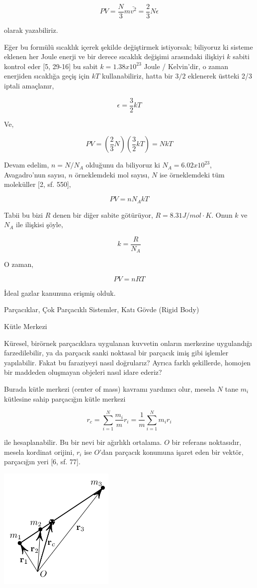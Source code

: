 \documentclass[12pt,fleqn]{article}\usepackage{../../common}
\begin{document}
$$
PV = \frac{N}{3} m \bar{v^2} = \frac{2}{3} N \epsilon
$$

olarak yazabiliriz.

Eğer bu formülü sıcaklık içerek şekilde değiştirmek istiyorsak; biliyoruz ki
sisteme eklenen her Joule enerji ve bir derece sıcaklık değişimi arasındaki
ilişkiyi $k$ sabiti kontrol eder [5, 29-16] bu sabit $k = 1.38 x 10^{23}$ Joule
/ Kelvin'dir, o zaman enerjiden sıcaklığa geçiş için $kT$ kullanabiliriz, hatta
bir $3/2$ eklenerek üstteki 2/3 iptali amaçlanır,

$$
\epsilon = \frac{3}{2} k T
$$

Ve,

$$
PV = \left( \frac{2}{3} N \right) \left( \frac{3}{2} k T \right) = N k T
$$

Devam edelim, $n = N / N_A$ olduğunu da biliyoruz ki $N_A = 6.02 x 10^{23}$,
Avagadro'nun sayısı, $n$ örneklemdeki mol sayısı, $N$ ise örneklemdeki tüm
moleküller [2, sf. 550],

$$
PV = n N_A k T
$$

Tabii bu bizi $R$ denen bir diğer sabite götürüyor, $R = 8.31 J/mol \cdot
K$. Onun $k$ ve $N_A$ ile ilişkisi şöyle,

$$
k = \frac{R}{N_A}
$$

O zaman,

$$
PV = n R T
$$

İdeal gazlar kanununa erişmiş olduk.


Parçacıklar, Çok Parçacıklı Sistemler, Katı Gövde (Rigid Body)

Kütle Merkezi

Küresel, birörnek parçacıklara uygulanan kuvvetin onların merkezine uygulandığı
farzedilebilir, ya da parçacık sanki noktasal bir parçacık imiş gibi işlemler
yapılabilir. Fakat bu faraziyeyi nasıl doğrularız? Ayrıca farklı şekillerde,
homojen bir maddeden oluşmayan objeleri nasıl idare ederiz?

Burada kütle merkezi (center of mass) kavramı yardımcı olur, mesela $N$ tane
$m_i$ kütlesine sahip parçacığın kütle merkezi

$$
r_c =
\sum _{i=1}^{N} \frac{m_i}{m} r_i =
\frac{1}{m} \sum _{i=1}^{N} m_i r_i
$$

ile hesaplanabilir. Bu bir nevi bir ağırlıklı ortalama. $O$ bir referans
noktasıdır, mesela kordinat orijini, $r_i$ ise $O$'dan parçacık konumuna işaret
eden bir vektör, parçacığın yeri [6, sf. 77].

\includegraphics[width=15em]{phy_005_basics_08.png}
\end{document}
